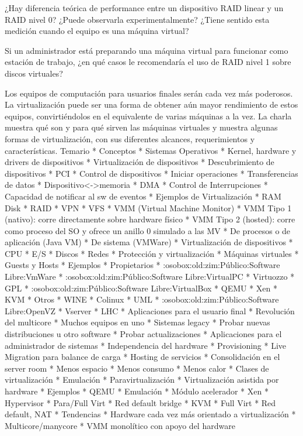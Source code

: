 


	\item ¿Hay diferencia teórica de performance entre un dispositivo RAID linear y un RAID nivel 0? ¿Puede observarla experimentalmente? ¿Tiene sentido esta medición cuando el equipo es una máquina virtual? 
	\item Si un administrador está preparando una máquina virtual para funcionar como estación de trabajo, ¿en qué casos le recomendaría el uso de RAID nivel 1 sobre discos virtuales?



Los equipos de computación para usuarios finales serán cada vez más
poderosos. La virtualización puede ser una forma de obtener aún mayor
rendimiento de estos equipos, convirtiéndolos en el equivalente de
varias máquinas a la vez. La charla muestra qué son y para qué sirven
las máquinas virtuales y muestra algunas formas de virtualización, con
sus diferentes alcances, requerimientos y características.
Temario
* Conceptos
	* Sistemas Operativos
		* Kernel, hardware y drivers de dispositivos
		* Virtualización de dispositivos
			* Descubrimiento de dispositivos
				* PCI
			* Control de dispositivos
				* Iniciar operaciones
			* Transferencias de datos 
				* Dispositivo<->memoria
				* DMA
			* Control de Interrupciones
				* Capacidad de notificar al sw de eventos
		* Ejemplos de Virtualización
			* RAM Disk
			* RAID
			* VPN
			* VFS
	* VMM (Virtual Machine Monitor)
		* VMM Tipo 1 (nativo): corre directamente sobre hardware físico 
		* VMM Tipo 2 (hosted): corre como proceso del SO y ofrece un anillo 0 simulado a las MV
		* De procesos o de aplicación (Java VM)
		* De sistema (VMWare)
	* Virtualización de dispositivos
		* CPU
		* E/S
		* Discos
		* Redes
	* Protección y virtualización
	* Máquinas virtuales
		* Guests y Hosts
	* Ejemplos
		* Propietarios
			* :osobox:old:zim:Público:Software Libre:VmWare
			* :osobox:old:zim:Público:Software Libre:VirtualPC
			* Virtuozzo
		* GPL
			* :osobox:old:zim:Público:Software Libre:VirtualBox
			* QEMU
			* Xen
			* KVM
		* Otros
			* WINE
			* Colinux
			* UML
			* :osobox:old:zim:Público:Software Libre:OpenVZ
			* Vserver
			* LHC
* Aplicaciones para el usuario final
	* Revolución del multicore
		* Muchos equipos en uno
	* Sistemas legacy
	* Probar nuevas distribuciones u otro software
	* Probar actualizaciones
* Aplicaciones para el administrador de sistemas
	* Independencia del hardware
	* Provisioning
	* Live Migration para balance de carga
	* Hosting de servicios
	* Consolidación en el server room
		* Menos espacio
		* Menos consumo
		* Menos calor
* Clases de virtualización
	* Emulación 
	* Paravirtualización
	* Virtualización asistida por hardware
* Ejemplos
	* QEMU
		* Emulación
		* Módulo acelerador
	* Xen
		* Hypervisor
		* Para/Full Virt
		* Red default bridge
	* KVM
		* Full Virt
		* Red default, NAT
* Tendencias
	* Hardware cada vez más orientado a virtualización
	* Multicore/manycore
	* VMM monolítico con apoyo del hardware
